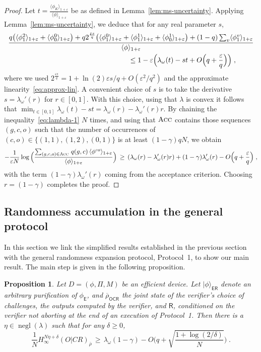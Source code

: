 \documentclass[11pt]{article}
\newtheorem{proposition}[theorem]{Proposition}
\theoremstyle{remark}
\theoremstyle{definition}
\newcommand{\ket}[1]{|#1\rangle}
\newcommand{\reg}[1]{{\textsf{#1}}}
\newcommand{\ol}[1]{\overline{#1}}
\DeclareMathOperator{\negl}{negl}
\newcommand{\eps}{\varepsilon}
\newcommand{\Acc}{\textsc{Acc}}
\newcommand{\Hmin}{H_\infty}
\begin{document}
\begin{proof}
Let $t = \frac{\langle \phi_K \rangle_{1+\eps} }{\langle \phi \rangle_{1+\eps}}$ be as defined in Lemma~\ref{lem:ms-uncertainty}. Applying Lemma~\ref{lem:ms-uncertainty}, we deduce that for any real parameter  $s$,
\begin{align}
 &\frac{   q\big(\langle \phi_1^2 \rangle_{1+\eps}+\langle \phi_0^0 \rangle_{1+\eps}\big)  + q2^{\frac{\eps s}{q}}\big( \langle \phi_1^0 \rangle_{1+\eps} + \langle \phi_1^1 \rangle_{1+\eps} + \langle \phi_0^1 \rangle_{1+\eps}\big)+(1-q)\sum_v \langle \phi_1^v \rangle_{1+\eps}}{\langle \phi \rangle_{1+\eps} }\notag \\
&\hskip6cm \leq 1 - \eps\Big( \lambda_\omega(t) -st +O\Big(q+\frac{\eps}{q}\Big)\Big)\;,\label{eq:lambda-1}
\end{align}
where we used $2^{\frac{\eps s}{q}} = 1+\ln(2)\eps s/q + O(\eps^2/q^2)$ and the approximate linearity~\eqref{eq:approx-lin}. 
A convenient choice of $s$ is to take the derivative $s=\lambda_\omega'(r)$ for $r\in[0,1]$. With this choice, using that $\lambda$ is convex it follows that $\min_{t\in[0,1]} \lambda_\omega(t)-st = \lambda_\omega(r)-\lambda_\omega'(r)r$.
By chaining the inequality~\eqref{eq:lambda-1} $N$ times, and using that $\Acc$ contains those sequences $(g,c,o)$ such that the number of occurrences of $(c,o)\in\{(1,1),(1,2),(0,1)\}$ is at least $(1-\gamma)qN$, we obtain
$$ - \frac{1}{\eps N} \log \Big( \frac{ \sum_{(g,c,o) \in \Acc} \,q(g,c) \,\langle \phi^{co} \rangle_{1+\eps}}{\langle \phi \rangle_{1+\eps} }\Big) \,\geq\, (\lambda_\omega(r)-\lambda_\omega'(r)r) + (1-\gamma)\lambda_\omega'(r) -O\Big(q+\frac{\eps}{q}\Big)\;,$$
with  the term $(1-\gamma)\lambda_\omega'(r)$ coming from the acceptance criterion. Choosing $r=(1-\gamma)$ completes the proof. 
\end{proof}

\subsection{Randomness accumulation in the general protocol}
\label{sec:randomness}

In this section we link the simplified results established in the previous section with the general randomness expansion protocol, Protocol~1, to show our main result. 
The main step is given in the following proposition. 

\begin{proposition}\label{prop:randomness}
Let $D=(\phi,\Pi,M)$ be an efficient device.
Let $\ket{\phi}_{\reg{ER}}$ denote an arbitrary purification of $\phi_\reg{E}$, and $\ol{\rho}_{\reg{OCR}}$ the joint state of the verifier's choice of challenges, the outputs computed by the verifier, and $\reg{R}$, conditioned on the verifier not aborting at the end of an execution of Protocol~1. 
 Then there is a $\eta\in\negl(\lambda)$ such that for any $\delta \geq 0$,  
\begin{equation}\label{eq:ent-bound-1}
\frac{1}{N}\Hmin^{N\eta+\delta}(O|CR)_{\ol{\rho}} \,\geq\, \lambda_\omega(1-\gamma) - O\Big(q+\sqrt{\frac{1+\log(2/\delta)}{N}}\Big)\;.
\end{equation}
\end{proposition}
\end{document}
